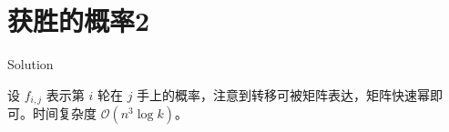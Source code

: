 \section{获胜的概率2}

\begin{frame}{Solution}

设 $f_{i,j}$ 表示第 $i$ 轮在 $j$ 手上的概率，注意到转移可被矩阵表达，矩阵快速幂即可。时间复杂度 $\mathcal O(n^3\log k)$。

\end{frame}